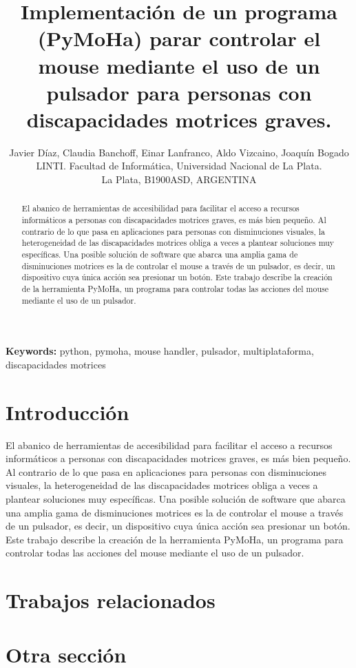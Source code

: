 \documentclass[final,narroweqnarray,inline,twoside]{ieee}
\author{Javier Díaz, Claudia Banchoff, Einar Lanfranco, Aldo Vizcaino, Joaquín Bogado
\\LINTI. Facultad de Informática, Universidad Nacional de La Plata.
\\La Plata, B1900ASD, ARGENTINA
}
\title{Implementación de un programa (PyMoHa) parar controlar el mouse mediante el uso de un pulsador para personas con discapacidades motrices graves.}
\begin{document}
\maketitle
\sloppy

\begin{abstract}
El abanico de herramientas de accesibilidad para facilitar el acceso a recursos informáticos a personas con discapacidades
motrices graves, es más bien pequeño. Al contrario de lo que pasa en aplicaciones para personas con disminuciones visuales,
la heterogeneidad de las discapacidades motrices obliga a veces a plantear soluciones muy específicas.
Una posible solución de software que abarca una amplia gama de disminuciones motrices es la de controlar el mouse a
través de un pulsador, es decir, un dispositivo cuya única acción sea presionar un botón. Este trabajo describe la creación
de la herramienta PyMoHa, un programa para controlar todas las acciones del mouse mediante el uso de un pulsador.
\end{abstract}

\noindent \textbf{Keywords: } python, pymoha, mouse handler, pulsador, multiplataforma, discapacidades motrices

\section{Introducción}
El abanico de herramientas de accesibilidad para facilitar el acceso a recursos informáticos a personas con discapacidades
motrices graves, es más bien pequeño. Al contrario de lo que pasa en aplicaciones para personas con disminuciones visuales,
la heterogeneidad de las discapacidades motrices obliga a veces a plantear soluciones muy específicas.
Una posible solución de software que abarca una amplia gama de disminuciones motrices es la de controlar el mouse a
través de un pulsador, es decir, un dispositivo cuya única acción sea presionar un botón. Este trabajo describe la creación
de la herramienta PyMoHa, un programa para controlar todas las acciones del mouse mediante el uso de un pulsador.
\section{Trabajos relacionados}

\section{Otra sección}
\end{document}
